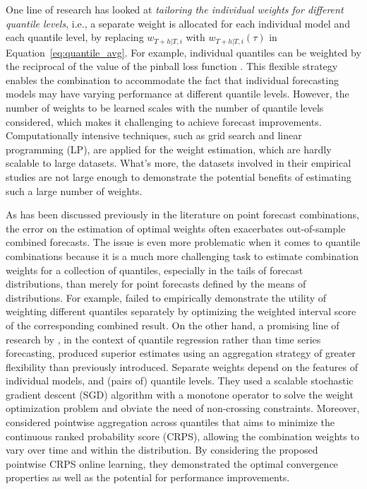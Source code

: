 \documentclass[a4paper,11pt]{article}
\begin{document}
One line of research has looked at \textit{tailoring the individual weights for different quantile levels}, i.e., a separate weight is allocated for each individual model and each quantile level, by replacing $w_{T+h|T,i}$ with $w_{T+h|T,i}(\tau)$ in Equation~\eqref{eq:quantile_avg}. For example, individual quantiles can be weighted by the reciprocal of the value of the pinball loss function \citep{Wang2019-lx,Zhang2020-dm,Browell2020-pa}. This flexible strategy enables the combination to accommodate the fact that individual forecasting models may have varying performance at different quantile levels. However, the number of weights to be learned scales with the number of quantile levels considered, which makes it challenging to achieve forecast improvements. Computationally intensive techniques, such as grid search and linear programming (LP), are applied for the weight estimation, which are hardly scalable to large datasets. What's more, the datasets involved in their empirical studies are not large enough to demonstrate the potential benefits of estimating such a large number of weights.

As has been discussed previously in the literature on point forecast combinations, the error on the estimation of optimal weights often exacerbates out-of-sample combined forecasts. The issue is even more problematic when it comes to quantile combinations because it is a much more challenging task to estimate combination weights for a collection of quantiles, especially in the tails of forecast distributions, than merely for point forecasts defined by the means of distributions. For example, \citet{Ray2022-co} failed to empirically demonstrate the utility of weighting different quantiles separately by optimizing the weighted interval score \citep[WIS,][]{Bracher2021-hx} of the corresponding combined result. On the other hand, a promising line of research by \citet{Kim2021-wa}, in the context of quantile regression rather than time series forecasting, produced superior estimates using an aggregation strategy of greater flexibility than previously introduced. Separate weights depend on the features of individual models, and (pairs of) quantile levels. They used a scalable stochastic gradient descent (SGD) algorithm with a monotone operator to solve the weight optimization problem and obviate the need of non-crossing constraints. Moreover, \citet{Berrisch2021-cr} considered pointwise aggregation across quantiles that aims to minimize the continuous ranked probability score (CRPS), allowing the combination weights to vary over time and within the distribution. By considering the proposed pointwise CRPS online learning, they demonstrated the optimal convergence properties as well as the potential for performance improvements.
\end{document}
